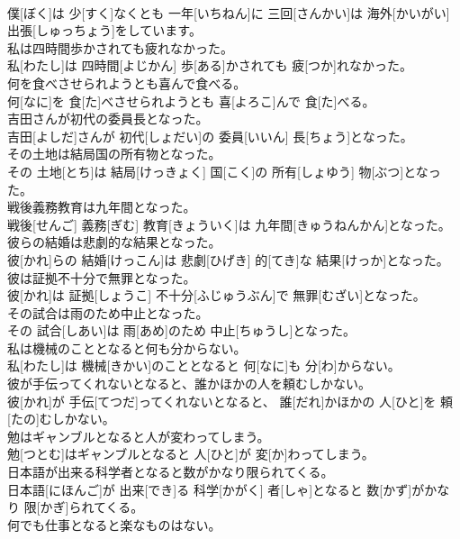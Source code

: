 \documentclass[8pt]{extreport}
\begin{document}
\begin{CJK}{UTF8}{min}
\\	僕[ぼく]は 少[すく]なくとも 一年[いちねん]に 三回[さんかい]は 海外[かいがい] 出張[しゅっちょう]をしています。
\\	私は四時間歩かされても疲れなかった。	
\\	私[わたし]は 四時間[よじかん] 歩[ある]かされても 疲[つか]れなかった。
\\	何を食べさせられようとも喜んで食べる。	
\\	何[なに]を 食[た]べさせられようとも 喜[よろこ]んで 食[た]べる。
\\	吉田さんが初代の委員長となった。	
\\	吉田[よしだ]さんが 初代[しょだい]の 委員[いいん] 長[ちょう]となった。
\\	その土地は結局国の所有物となった。	
\\	その 土地[とち]は 結局[けっきょく] 国[こく]の 所有[しょゆう] 物[ぶつ]となった。
\\	戦後義務教育は九年間となった。	
\\	戦後[せんご] 義務[ぎむ] 教育[きょういく]は 九年間[きゅうねんかん]となった。
\\	彼らの結婚は悲劇的な結果となった。	
\\	彼[かれ]らの 結婚[けっこん]は 悲劇[ひげき] 的[てき]な 結果[けっか]となった。
\\	彼は証拠不十分で無罪となった。	
\\	彼[かれ]は 証拠[しょうこ] 不十分[ふじゅうぶん]で 無罪[むざい]となった。
\\	その試合は雨のため中止となった。	
\\	その 試合[しあい]は 雨[あめ]のため 中止[ちゅうし]となった。
\\	私は機械のこととなると何も分からない。	
\\	私[わたし]は 機械[きかい]のこととなると 何[なに]も 分[わ]からない。
\\	彼が手伝ってくれないとなると、誰かほかの人を頼むしかない。	
\\	彼[かれ]が 手伝[てつだ]ってくれないとなると、 誰[だれ]かほかの 人[ひと]を 頼[たの]むしかない。
\\	勉はギャンブルとなると人が変わってしまう。	
\\	勉[つとむ]はギャンブルとなると 人[ひと]が 変[か]わってしまう。
\\	日本語が出来る科学者となると数がかなり限られてくる。	
\\	日本語[にほんご]が 出来[でき]る 科学[かがく] 者[しゃ]となると 数[かず]がかなり 限[かぎ]られてくる。
\\	何でも仕事となると楽なものはない。	

\end{CJK}
\end{document}
